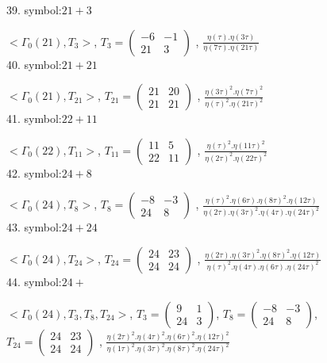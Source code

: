 39. symbol:$ 21+3 $

$ < \Gamma_0 ( 21 ), T_3 >  $,
$
T_3 = 
\left(
\begin{array}{cc}
-6 & -1 \\
21 & 3
\end{array}
\right)
$
, {$ \frac{\eta(\tau) . \eta(3\tau)}{\eta(7\tau) . \eta(21\tau)} $}
\\

40. symbol:$ 21+21 $

$ < \Gamma_0 ( 21 ), T_{21} >  $,
$
T_{21} = 
\left(
\begin{array}{cc}
21 & 20 \\
21 & 21
\end{array}
\right)
$
, {$ \frac{\eta(3\tau)^2 . \eta(7\tau)^2}{\eta(\tau)^2 . \eta(21\tau)^2} $}
\\

41. symbol:$ 22+11 $

$ < \Gamma_0 ( 22 ), T_{11} >  $,
$
T_{11} = 
\left(
\begin{array}{cc}
11 & 5 \\
22 & 11
\end{array}
\right)
$
, {$ \frac{\eta(\tau)^2 . \eta(11\tau)^2}{\eta(2\tau)^2 . \eta(22\tau)^2} $}
\\

42. symbol:$ 24+8 $

$ < \Gamma_0 ( 24 ), T_8 >  $,
$
T_8 = 
\left(
\begin{array}{cc}
-8 & -3 \\
24 & 8
\end{array}
\right)
$
, {$ \frac{\eta(\tau)^2 . \eta(6\tau) .\eta(8\tau)^2 .\eta(12\tau)}{\eta(2\tau) . \eta(3\tau)^2 .\eta(4\tau) .\eta(24\tau)^2} $}
\\

43. symbol:$ 24+24 $

$ < \Gamma_0 ( 24 ), T_{24} >  $,
$
T_{24} = 
\left(
\begin{array}{cc}
24 & 23 \\
24 & 24
\end{array}
\right)
$
, {$ \frac{\eta(2\tau) . \eta(3\tau)^2 .\eta(8\tau)^2 .\eta(12\tau)}{\eta(\tau)^2 . \eta(4\tau) .\eta(6\tau) .\eta(24\tau)^2} $}
\\

44. symbol:$ 24+ $

$ < \Gamma_0 ( 24 ), T_3, T_8, T_{24} >  $,
$
T_3 = 
\left(
\begin{array}{cc}
9 & 1 \\
24 & 3
\end{array}
\right)
$,
$
T_8 = 
\left(
\begin{array}{cc}
-8 & -3 \\
24 & 8
\end{array}
\right)
$,
$
T_{24} = 
\left(
\begin{array}{cc}
24 & 23 \\
24 & 24
\end{array}
\right)
$
, {$ \frac{\eta(2\tau)^2 . \eta(4\tau)^2 .\eta(6\tau)^2 .\eta(12\tau)^2}{\eta(1\tau)^2 . \eta(3\tau)^2 .\eta(8\tau)^2 .\eta(24\tau)^2} $}
\\